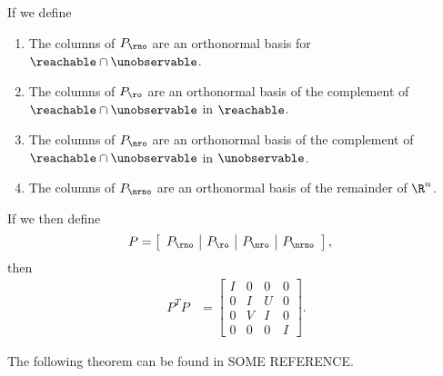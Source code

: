 If we define
\begin{enumerate}
    \item The columns of $P_\rno$ are an orthonormal basis for $\reachable \cap \unobservable$.
    \item The columns of $P_\ro$ are an orthonormal basis of
        the complement of $\reachable \cap \unobservable$ in $\reachable$.
    \item The columns of $P_\nro$ are an orthonormal basis of
        the complement of $\reachable \cap \unobservable$ in $\unobservable$.
    \item The columns of $P_\nrno$ are an orthonormal basis of
        the remainder of $\R^n$.
\end{enumerate}
If we then define
\begin{align*}
    P &= 
    \left[ \begin{array}{c|c|c|c}
        P_\rno & P_\ro & P_\nro & P_\nrno
    \end{array} \right] ,
\end{align*}
then
\begin{align*}
    P^T P
    &=
    \left[ \begin{array}{c|c|c|c}
        I & 0 & 0 & 0 \\
        \hline
        0 & I & U & 0 \\
        \hline
        0 & V & I & 0 \\
        \hline
        0 & 0 & 0 & I 
    \end{array} \right] .
\end{align*}

The following theorem can be found in SOME REFERENCE.

